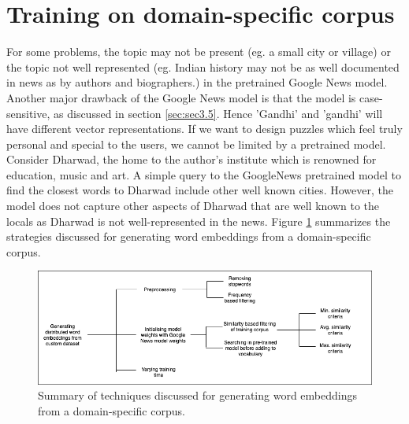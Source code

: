 \documentclass[twoside]{article}
\begin{document}
\section{Training on domain-specific corpus}
\label{sec:sec4}
For some problems, the topic may not be present (eg. a small city or village) or the topic not well represented (eg. Indian history may not be as well documented in news as by authors and biographers.) in the pretrained Google News model. Another major drawback of the Google News model is that the model is case-sensitive, as discussed in section \ref{sec:sec3.5}. Hence 'Gandhi' and 'gandhi' will have different vector representations. If we want to design puzzles which feel truly personal and special to the users, we cannot be limited by a pretrained model. Consider Dharwad, the home to the author's institute which is renowned for education, music and art. A simple query to the GoogleNews pretrained model to find the closest words to Dharwad include other well known cities. However, the model does not capture other aspects of Dharwad that are well known to the locals as Dharwad is not well-represented in the news. Figure \ref{fig:fig4.4.1} summarizes the strategies discussed for generating word embeddings from a domain-specific corpus.

\begin{figure}
  \centering
  \includegraphics[width=\textwidth]{images/custom_training.png}
  \caption{Summary of techniques discussed for generating word embeddings from a domain-specific corpus.}
  \label{fig:fig4.4.1}
\end{figure}
\end{document}

